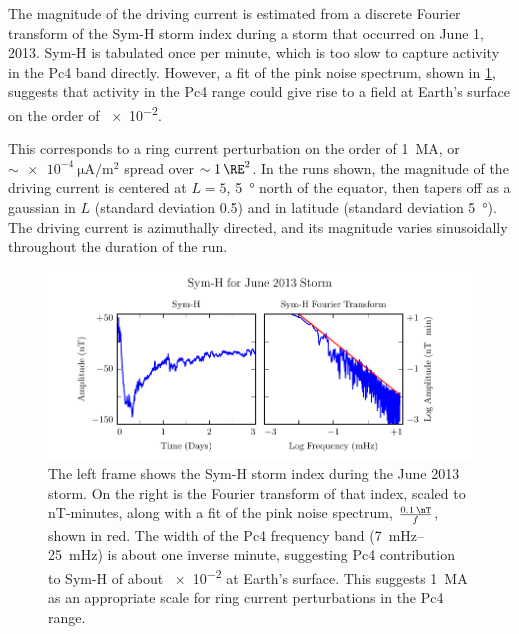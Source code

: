 \documentclass[draft,linenumbers]{agujournal}
\begin{document}

The magnitude of the driving current is estimated from a discrete Fourier transform of the Sym-H storm index during a storm that occurred on June 1, 2013. Sym-H is tabulated once per minute, which is too slow to capture activity in the Pc4 band directly. However, a fit of the pink noise spectrum, shown in \cref{fig_symh}, suggests that activity in the Pc4 range could give rise to a field at Earth's surface on the order of \SI{e-2}{\nT}.

This corresponds to a ring current perturbation on the order of \SI{1}{\mega\A}, or $\sim\SI{e-4}{\uA/\m\squared}$ spread over $\sim\SI{1}{\RE}^2$. In the runs shown, the magnitude of the driving current is centered at $L = 5$, \SI{5}{\degree} north of the equator, then tapers off as a gaussian in $L$ (standard deviation \SI{0.5}{\RE}) and in latitude (standard deviation \SI{5}{\degree}). The driving current is azimuthally directed, and its magnitude varies sinusoidally throughout the duration of the run.

\begin{figure}
    \begin{center}
    \includegraphics[width=\textwidth]{figures/fig_symh.pdf}
    \caption{
    The left frame shows the Sym-H storm index during the June 2013 storm. On the right is the Fourier transform of that index, scaled to \si{nT}-minutes, along with a fit of the pink noise spectrum, $\frac{ \SI{0.1}{\nT} }{f}$, shown in red. The width of the Pc4 frequency band (\SIrange{7}{25}{\mHz}) is about one inverse minute, suggesting Pc4 contribution to Sym-H of about \SI{e-2}{\nT} at Earth's surface. This suggests \SI{1}{\mega\A} as an appropriate scale for ring current perturbations in the Pc4 range.
    }
    \label{fig_symh}
    \end{center}
\end{figure}

\end{document}
